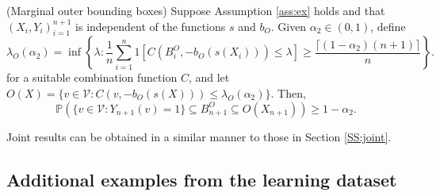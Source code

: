 \begin{corollary}\label{thm:boxgenouter}
	(Marginal outer bounding boxes)
	Suppose Assumption \ref{ass:ex} holds and that $(X_i, Y_i)_{i = 1}^{n+1}$ is independent of the functions $s$ and $b_O$. Given $\alpha_2 \in (0,1)$, define 
	\begin{equation}
		\lambda_O({\alpha_2})= \inf\left\lbrace \lambda: \frac{1}{n} \sum_{i = 1}^n 1\left[ C(B^O_i, -b_O(s(X_i))) \leq \lambda \right] \geq  \frac{\lceil (1-\alpha_2)(n+1) \rceil}{n} \right\rbrace.
	\end{equation}
	for a suitable combination function $C$, and let $O(X) = \lbrace v \in \mathcal{V}: C(v, -b_O(s(X))) \leq \lambda_O(\alpha_2)  \rbrace $. Then,
	\begin{equation*}\label{eq:probstat}
		\mathbb{P}\left( \lbrace v\in \mathcal{V}: Y_{n+1}(v) = 1 \rbrace \subseteq B^O_{n+1} \subseteq O(X_{n+1}) \right) \geq 1 - \alpha_2.
	\end{equation*}
\end{corollary}
Joint results can be obtained in a similar manner to those in Section \ref{SS:joint}.

\newpage
\subsection{Additional examples from the learning dataset}

